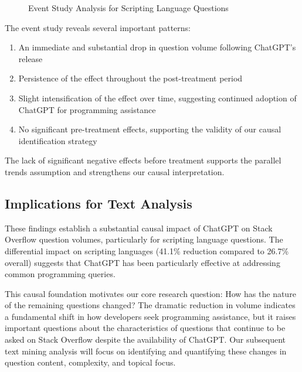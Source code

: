 \begin{figure}[htb]
\centering
\caption{Event Study Analysis for Scripting Language Questions}
\label{fig:event_study}
\end{figure}

The event study reveals several important patterns:

\begin{enumerate}
\item An immediate and substantial drop in question volume following ChatGPT's release
\item Persistence of the effect throughout the post-treatment period
\item Slight intensification of the effect over time, suggesting continued adoption of ChatGPT for programming assistance
\item No significant pre-treatment effects, supporting the validity of our causal identification strategy
\end{enumerate}

The lack of significant negative effects before treatment supports the parallel trends assumption and strengthens our causal interpretation.

\subsection{Implications for Text Analysis}

These findings establish a substantial causal impact of ChatGPT on Stack Overflow question volumes, particularly for scripting language questions. The differential impact on scripting languages (41.1\% reduction compared to 26.7\% overall) suggests that ChatGPT has been particularly effective at addressing common programming queries.

This causal foundation motivates our core research question: How has the nature of the remaining questions changed? The dramatic reduction in volume indicates a fundamental shift in how developers seek programming assistance, but it raises important questions about the characteristics of questions that continue to be asked on Stack Overflow despite the availability of ChatGPT. Our subsequent text mining analysis will focus on identifying and quantifying these changes in question content, complexity, and topical focus.